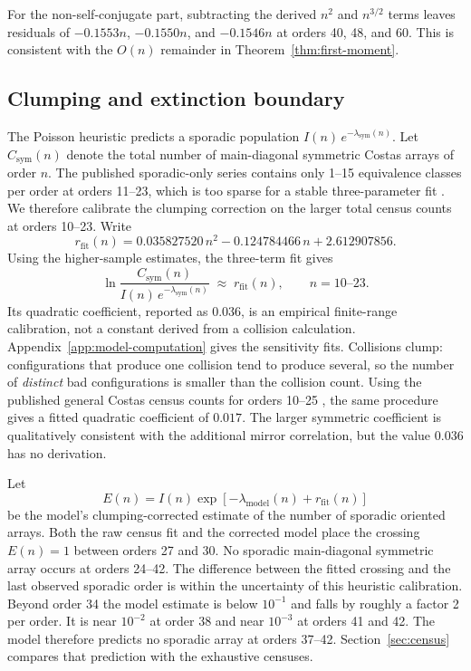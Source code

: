 \documentclass[11pt]{article}
\begin{document}
For the non-self-conjugate part, subtracting the derived $n^2$ and
$n^{3/2}$ terms leaves residuals of $-0.1553n$, $-0.1550n$, and
$-0.1546n$ at orders 40, 48, and 60.  This is consistent with the $O(n)$
remainder in Theorem~\ref{thm:first-moment}.

\subsection{Clumping and extinction boundary}

The Poisson heuristic predicts a sporadic population
$I(n)\,e^{-\lambda_{\mathrm{sym}}(n)}$.  Let
$C_{\mathrm{sym}}(n)$ denote the total number of main-diagonal symmetric
Costas arrays of order $n$.  The published sporadic-only series contains
only 1--15 equivalence classes per order at orders 11--23, which is too
sparse for a stable three-parameter fit
\cite{RickardDrakakis2009Symmetry}.  We therefore calibrate the clumping
correction on the larger total census counts at orders 10--23.  Write
\[
r_{\mathrm{fit}}(n)
=0.035827520\,n^2-0.124784466\,n+2.612907856.
\]
Using the higher-sample estimates, the three-term fit gives
\[
\ln\frac{C_{\mathrm{sym}}(n)}{I(n)\,e^{-\lambda_{\mathrm{sym}}(n)}}
\;\approx\; r_{\mathrm{fit}}(n),
\qquad n = 10\text{--}23 .
\]
Its quadratic coefficient, reported as $0.036$, is an empirical finite-range
calibration, not a constant derived from a collision calculation.
Appendix~\ref{app:model-computation} gives the sensitivity fits.
Collisions clump: configurations that produce one collision tend to
produce several, so the number of \emph{distinct} bad configurations is
smaller than the collision count.  Using the published general Costas census
counts for orders 10--25
\cite{DrakakisIorioRickard2011Order28,DrakakisIorioRickardWalsh2011Order29},
the same procedure gives a fitted quadratic coefficient of $0.017$.
The larger symmetric coefficient is qualitatively consistent with the
additional mirror correlation, but the value $0.036$ has no derivation.

Let
\[
E(n)=I(n)\exp\!\left[-\lambda_{\mathrm{model}}(n)
+r_{\mathrm{fit}}(n)\right]
\]
be the model's clumping-corrected estimate of the number of sporadic oriented
arrays.  Both the raw census fit and the corrected model place the crossing
$E(n)=1$ between orders 27 and 30.  No sporadic main-diagonal symmetric array
occurs at orders 24--42.
The difference between the
fitted crossing and the last observed sporadic order is within the
uncertainty of this heuristic calibration.  Beyond order 34 the
model estimate is below $10^{-1}$ and falls by roughly a factor 2
per order.  It is near $10^{-2}$ at order 38 and near $10^{-3}$ at orders
41 and 42.  The model therefore predicts no sporadic array at orders
37--42.  Section~\ref{sec:census} compares that prediction with the
exhaustive censuses.
\end{document}
